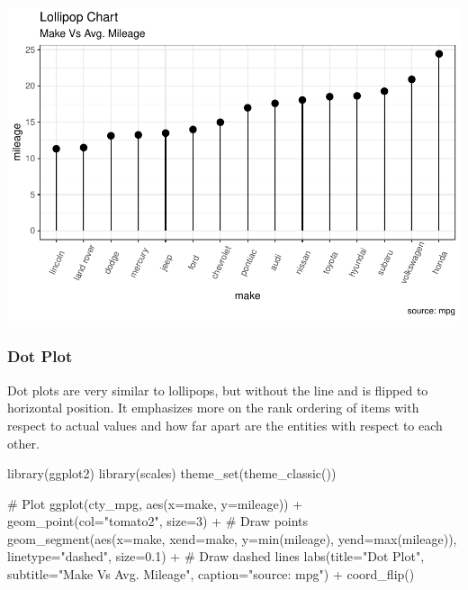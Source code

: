 \documentclass[a4paper]{article}
\newenvironment{Shaded}{}{}
\newcommand{\KeywordTok}[1]{\textcolor[rgb]{0.00,0.00,1.00}{#1}}
\newcommand{\DataTypeTok}[1]{#1}
\newcommand{\DecValTok}[1]{#1}
\newcommand{\FloatTok}[1]{#1}
\newcommand{\StringTok}[1]{\textcolor[rgb]{0.00,0.50,0.50}{#1}}
\newcommand{\CommentTok}[1]{\textcolor[rgb]{0.00,0.50,0.00}{#1}}
\newcommand{\OperatorTok}[1]{#1}
\newcommand{\NormalTok}[1]{#1}
\begin{document}
\includegraphics{M24-ggplot2_Gallery_files/figure-latex/unnamed-chunk-18-1.pdf}

\newpage

\subsubsection{Dot Plot}\label{dot-plot}

Dot plots are very similar to lollipops, but without the line and is
flipped to horizontal position. It emphasizes more on the rank ordering
of items with respect to actual values and how far apart are the
entities with respect to each other.

\begin{Shaded}
\begin{Highlighting}[]
\KeywordTok{library}\NormalTok{(ggplot2)}
\KeywordTok{library}\NormalTok{(scales)}
\KeywordTok{theme_set}\NormalTok{(}\KeywordTok{theme_classic}\NormalTok{())}

\CommentTok{# Plot}
\KeywordTok{ggplot}\NormalTok{(cty_mpg, }\KeywordTok{aes}\NormalTok{(}\DataTypeTok{x=}\NormalTok{make, }\DataTypeTok{y=}\NormalTok{mileage)) }\OperatorTok{+}\StringTok{ }
\StringTok{  }\KeywordTok{geom_point}\NormalTok{(}\DataTypeTok{col=}\StringTok{"tomato2"}\NormalTok{, }\DataTypeTok{size=}\DecValTok{3}\NormalTok{) }\OperatorTok{+}\StringTok{   }\CommentTok{# Draw points}
\StringTok{  }\KeywordTok{geom_segment}\NormalTok{(}\KeywordTok{aes}\NormalTok{(}\DataTypeTok{x=}\NormalTok{make, }
                   \DataTypeTok{xend=}\NormalTok{make, }
                   \DataTypeTok{y=}\KeywordTok{min}\NormalTok{(mileage), }
                   \DataTypeTok{yend=}\KeywordTok{max}\NormalTok{(mileage)), }
               \DataTypeTok{linetype=}\StringTok{"dashed"}\NormalTok{, }
               \DataTypeTok{size=}\FloatTok{0.1}\NormalTok{) }\OperatorTok{+}\StringTok{   }\CommentTok{# Draw dashed lines}
\StringTok{  }\KeywordTok{labs}\NormalTok{(}\DataTypeTok{title=}\StringTok{"Dot Plot"}\NormalTok{, }
       \DataTypeTok{subtitle=}\StringTok{"Make Vs Avg. Mileage"}\NormalTok{, }
       \DataTypeTok{caption=}\StringTok{"source: mpg"}\NormalTok{) }\OperatorTok{+}\StringTok{  }
\StringTok{  }\KeywordTok{coord_flip}\NormalTok{()}
\end{Highlighting}
\end{Shaded}
\end{document}
